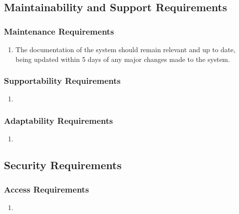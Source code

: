 \documentclass[]{article}
\begin{document}
\subsection{Maintainability and Support Requirements}
\label{sub:maintainability_and_support_requirements}

\subsubsection{Maintenance Requirements}
\label{ssub:maintenance_requirements}
\begin{enumerate}[{MS}1. ]
	\item The documentation of the system should remain relevant and up to date, being updated within 5 days of any major changes made to the system.
\end{enumerate}

\subsubsection{Supportability Requirements}
\label{ssub:supportability_requirements}
\begin{enumerate}[{MS}1. ]
	\item 
\end{enumerate}

\subsubsection{Adaptability Requirements}
\label{ssub:adaptability_requirements}
\begin{enumerate}[{MS}1. ]
	\item 
\end{enumerate}


\subsection{Security Requirements}
\label{sub:security_requirements}

\subsubsection{Access Requirements}
\label{ssub:access_requirements}
\begin{enumerate}[{SR}1. ]
	\item 
\end{enumerate}
\end{document}
